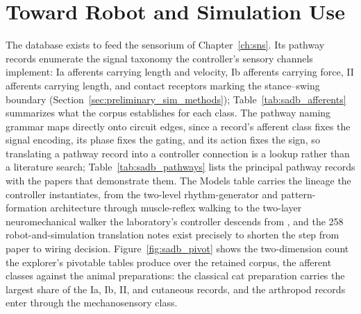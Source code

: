 \section{Toward Robot and Simulation Use}\label{sec:sadb_use}

The database exists to feed the sensorium of Chapter~\ref{ch:sns}. Its pathway records enumerate the signal taxonomy the controller's sensory channels implement: Ia afferents carrying length and velocity, Ib afferents carrying force, II afferents carrying length, and contact receptors marking the stance--swing boundary (Section~\ref{sec:preliminary_sim_methods}); Table~\ref{tab:sadb_afferents} summarizes what the corpus establishes for each class. The pathway naming grammar maps directly onto circuit edges, since a record's afferent class fixes the signal encoding, its phase fixes the gating, and its action fixes the sign, so translating a pathway record into a controller connection is a lookup rather than a literature search; Table~\ref{tab:sadb_pathways} lists the principal pathway records with the papers that demonstrate them. The Models table carries the lineage the controller instantiates, from the two-level rhythm-generator and pattern-formation architecture \citep{rybak_modelling_2006} through muscle-reflex walking \citep{geyer_musclereflex_2010} to the two-layer neuromechanical walker the laboratory's controller descends from \citep{deng_neuromechanical_2019}, and the 258 robot-and-simulation translation notes exist precisely to shorten the step from paper to wiring decision. Figure~\ref{fig:sadb_pivot} shows the two-dimension count the explorer's pivotable tables produce over the retained corpus, the afferent classes against the animal preparations: the classical cat preparation carries the largest share of the Ia, Ib, II, and cutaneous records, and the arthropod records enter through the mechanosensory class.

